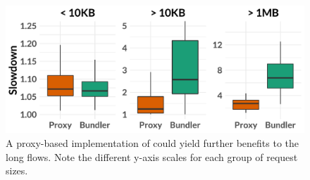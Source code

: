 \begin{figure}
    \centering
\begin{knitrout}
\color{fgcolor}
\includegraphics[width=\maxwidth]{figure/eval:proxy-1} 

\end{knitrout}
    \caption{A proxy-based implementation of \name could yield further benefits to the long flows. Note the different y-axis scales for each group of request sizes.}
    \label{fig:eval:proxy}
\end{figure}

